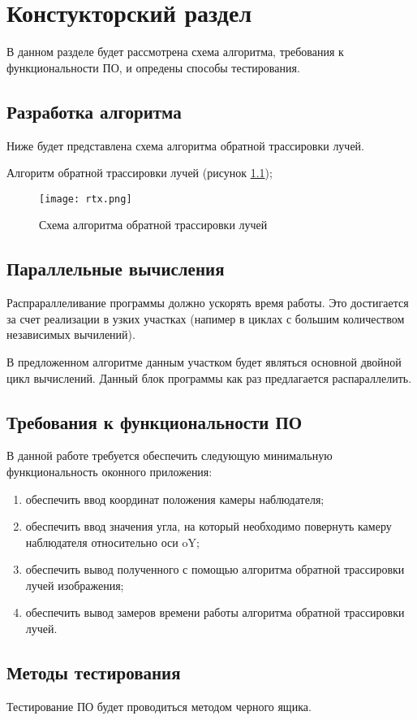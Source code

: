 \chapter{ Констукторский раздел}
\label{cha:design}
    В данном разделе будет рассмотрена схема алгоритма, требования к функциональности ПО,
    и опредены способы тестирования.
    
    \section{Разработка алгоритма}
        Ниже будет представлена схема алгоритма обратной трассировки лучей.

        Алгоритм обратной трассировки лучей (рисунок \ref{schema:rtx});


    \begin{figure}[h!]
        \centering
            \texttt{[image: rtx.png]}
            \caption{Схема алгоритма обратной трассировки лучей}
            \label{schema:rtx}
    \end{figure}

    \section{Параллельные вычисления}
Распрараллеливание программы должно ускорять время работы. Это достигается за счет реализации в узких участках (напимер в циклах с большим количеством независимых вычилений).

В предложенном алгоритме данным участком будет являться основной двойной цикл вычислений.
Данный блок программы как раз предлагается распараллелить.


    \section{Требования к функциональности ПО}
        В данной работе требуется обеспечить следующую минимальную функциональность оконного приложения:
        \begin{enumerate}
	\item обеспечить ввод координат положения камеры наблюдателя;
	\item обеспечить ввод значения угла, на который необходимо повернуть камеру наблюдателя относительно оси oY;
            \item обеспечить вывод полученного с помощью алгоритма обратной трассировки лучей изображения;
            \item обеспечить вывод замеров времени работы алгоритма обратной трассировки лучей.
        \end{enumerate}

    \section{Методы тестирования}
    Тестирование ПО будет проводиться методом черного ящика.

\newpage